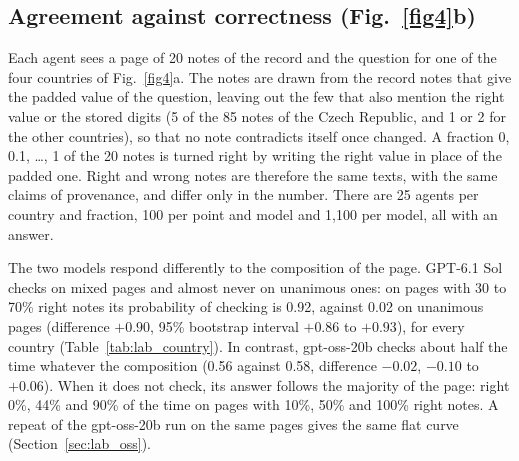 \documentclass[10pt]{article}
\begin{document}
\subsection{Agreement against correctness (Fig.~\ref{fig4}b)}
Each agent sees a page of 20 notes of the record and the question for one of the four countries of Fig.~\ref{fig4}a. The notes are drawn from the record notes that give the padded value of the question, leaving out the few that also mention the right value or the stored digits (5 of the 85 notes of the Czech Republic, and 1 or 2 for the other countries), so that no note contradicts itself once changed. A fraction 0, 0.1, \ldots, 1 of the 20 notes is turned right by writing the right value in place of the padded one. Right and wrong notes are therefore the same texts, with the same claims of provenance, and differ only in the number. There are 25 agents per country and fraction, 100 per point and model and 1,100 per model, all with an answer.

The two models respond differently to the composition of the page. GPT-6.1 Sol checks on mixed pages and almost never on unanimous ones: on pages with 30 to 70\% right notes its probability of checking is 0.92, against 0.02 on unanimous pages (difference $+0.90$, 95\% bootstrap interval $+0.86$ to $+0.93$), for every country (Table~\ref{tab:lab_country}). In contrast, gpt-oss-20b checks about half the time whatever the composition (0.56 against 0.58, difference $-0.02$, $-0.10$ to $+0.06$). When it does not check, its answer follows the majority of the page: right 0\%, 44\% and 90\% of the time on pages with 10\%, 50\% and 100\% right notes. A repeat of the gpt-oss-20b run on the same pages gives the same flat curve (Section~\ref{sec:lab_oss}).

\begin{table}[htbp]\centering\small
\caption{\textbf{By country.} Top: Fig.~\ref{fig4}a, the percentage of gpt-oss-20b agents that fetch the workbook, 25 per cell. Bottom: Fig.~\ref{fig4}b for each model, the probability of checking on mixed pages (30 to 70\% right notes) minus that on unanimous pages (all right or all wrong), with the two probabilities and the agents behind them.}\label{tab:lab_country}

\end{table}
\end{document}
